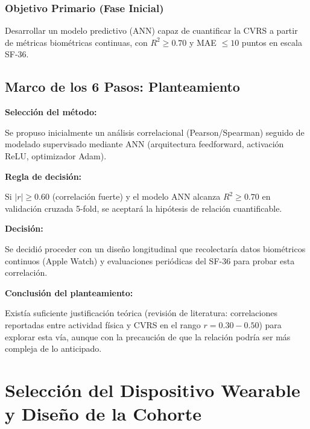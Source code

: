 \documentclass[12pt,letterpaper,twoside]{report}
\begin{document}
\subsection{Objetivo Primario (Fase Inicial)}

Desarrollar un modelo predictivo (ANN) capaz de cuantificar la CVRS a partir de métricas biométricas continuas, con $R^2 \geq 0.70$ y MAE $\leq 10$ puntos en escala SF-36.

\section{Marco de los 6 Pasos: Planteamiento}

\begin{estadisticobox}
\textbf{Selección del método:}

Se propuso inicialmente un análisis correlacional (Pearson/Spearman) seguido de modelado supervisado mediante ANN (arquitectura feedforward, activación ReLU, optimizador Adam).
\end{estadisticobox}

\begin{reglabox}
\textbf{Regla de decisión:}

Si $|r| \geq 0.60$ (correlación fuerte) y el modelo ANN alcanza $R^2 \geq 0.70$ en validación cruzada 5-fold, se aceptará la hipótesis de relación cuantificable.
\end{reglabox}

\begin{decisionbox}
\textbf{Decisión:}

Se decidió proceder con un diseño longitudinal que recolectaría datos biométricos continuos (Apple Watch) y evaluaciones periódicas del SF-36 para probar esta correlación.
\end{decisionbox}

\begin{conclusionbox}
\textbf{Conclusión del planteamiento:}

Existía suficiente justificación teórica (revisión de literatura: correlaciones reportadas entre actividad física y CVRS en el rango $r=0.30-0.50$) para explorar esta vía, aunque con la precaución de que la relación podría ser más compleja de lo anticipado.
\end{conclusionbox}

\chapter{Selección del Dispositivo Wearable y Diseño de la Cohorte}
\end{document}
